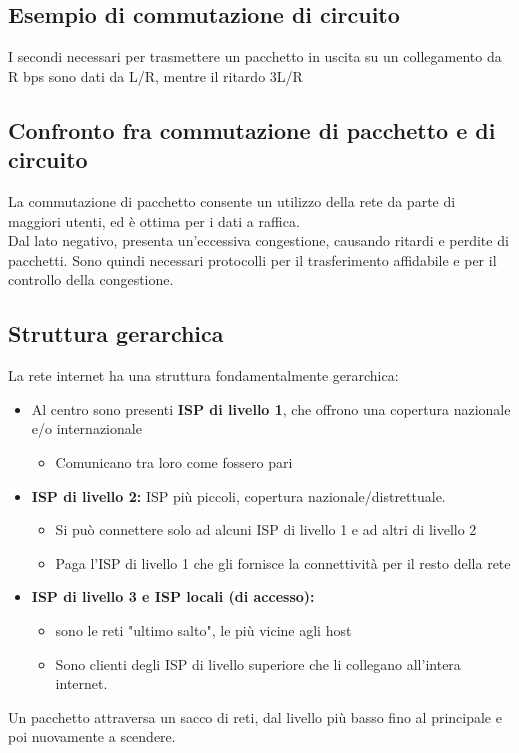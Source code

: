 \documentclass{report}
\begin{document}
	\subsection{Esempio di commutazione di circuito}
	I secondi necessari per trasmettere un pacchetto in uscita su un collegamento da R bps sono dati da L/R, mentre il ritardo 3L/R
	\subsection{Confronto fra commutazione di pacchetto e di circuito}
	La commutazione di pacchetto consente un utilizzo della rete da parte di maggiori utenti, ed è ottima per i dati a raffica.\medskip\\ Dal lato negativo, presenta un'eccessiva congestione, causando ritardi e perdite di pacchetti. Sono quindi necessari protocolli per il trasferimento affidabile e per il controllo della congestione.
	\subsection{Struttura gerarchica}
	La rete internet ha una struttura fondamentalmente gerarchica:
	\begin{itemize}
		\item Al centro sono presenti \textbf{ISP di livello 1}, che offrono una copertura nazionale e/o internazionale
		\begin{itemize}
			\item Comunicano tra loro come fossero pari
		\end{itemize}
		\item \textbf{ISP di livello 2:} ISP più piccoli, copertura nazionale/distrettuale.
		\begin{itemize}
			\item Si può connettere solo ad alcuni ISP di livello 1 e ad altri di livello 2
			\item Paga l'ISP di livello 1 che gli fornisce la connettività per il resto della rete
		\end{itemize}
		\item \textbf{ISP di livello 3 e ISP locali (di accesso):}
		\begin{itemize} 
			\item sono le reti "ultimo salto", le più vicine agli host
			\item Sono clienti degli ISP di livello superiore che li collegano all'intera internet.
		\end{itemize}
	\end{itemize}
	Un pacchetto attraversa un sacco di reti, dal livello più basso fino al principale e poi nuovamente a scendere.
	
	
\end{document}
